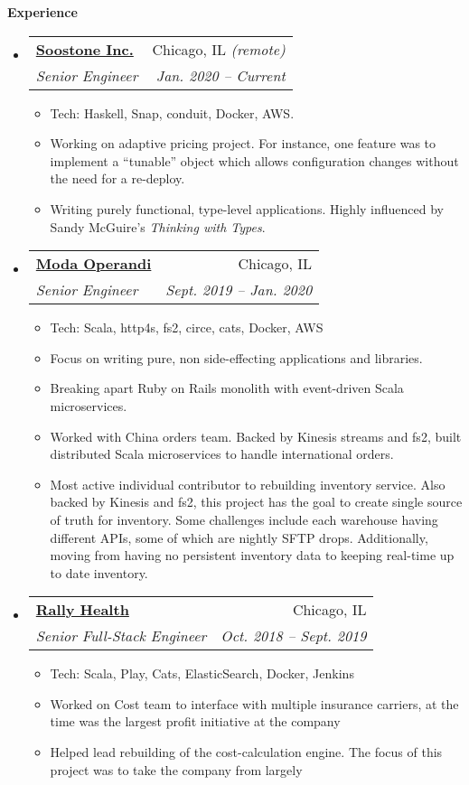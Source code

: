 \documentclass[letterpaper,11pt]{article}
\makeatletter
\newcommand{\resitem}[1]{\item #1 \vspace{-2pt}}
\newcommand{\resheading}[1]{{\large \colorbox{mygrey}{\begin{minipage}{\textwidth}{\textbf{#1 \vphantom{p\^{E}}}}\end{minipage}}}}
\newcommand{\ressubheading}[4]{
\begin{tabular*}{6.5in}{l@{\extracolsep{\fill}}r}
		\textbf{#1} & #2 \\
		\textit{#3} & \textit{#4} \\
\end{tabular*}\vspace{-6pt}}
\makeatother
\begin{document}
\resheading{Experience}
\begin{itemize}
\item
  \ressubheading{\href{http://www.soostone.com/}{Soostone Inc.}}{Chicago, IL \textit{(remote)}}{Senior Engineer}{Jan. 2020 -- Current}
    { \footnotesize
    \begin{itemize}
        \resitem{Tech: Haskell, Snap, conduit, Docker, AWS.}
        \resitem{Working on adaptive pricing project. For instance, one feature
        was to implement a ``tunable'' object which allows configuration
      changes without the need for a re-deploy.}
        \resitem{Writing purely functional, type-level applications. Highly
        influenced by Sandy McGuire's \textit{Thinking with Types}.}
    \end{itemize}
    }
\item
  \ressubheading{\href{http://www.modaoperandi.com/}{Moda Operandi}}{Chicago, IL}{Senior Engineer}{Sept. 2019 -- Jan. 2020}
    { \footnotesize
    \begin{itemize}
        \resitem{Tech: Scala, http4s, fs2, circe, cats, Docker, AWS}
        \resitem{Focus on writing pure, non side-effecting applications and libraries.}
        \resitem{Breaking apart Ruby on Rails monolith with event-driven Scala microservices.}
        \resitem{Worked with China orders team. Backed by Kinesis streams and fs2, built distributed Scala
        microservices to handle international orders.}
        \resitem{Most active individual contributor to rebuilding inventory
        service. Also backed by Kinesis and fs2, this project has the goal to
        create single source of truth for inventory. Some challenges include
        each warehouse having different APIs, some of which are nightly SFTP
        drops.  Additionally, moving from having no persistent inventory data
        to keeping real-time up to date inventory.}
    \end{itemize}
    }
\item
  \ressubheading{\href{http://www.rallyhealth.com/}{Rally Health}}{Chicago, IL}{Senior Full-Stack Engineer}{Oct. 2018 -- Sept. 2019}
    { \footnotesize
    \begin{itemize}
        \resitem{Tech: Scala, Play, Cats, ElasticSearch, Docker, Jenkins}
        \resitem{Worked on Cost team to interface with multiple insurance carriers, at the time was the largest profit initiative at the company}
        \resitem{Helped lead rebuilding of the cost-calculation engine. The focus of this project was to take the company from largely 
}
\end{itemize}}
\end{itemize}
\end{document}

